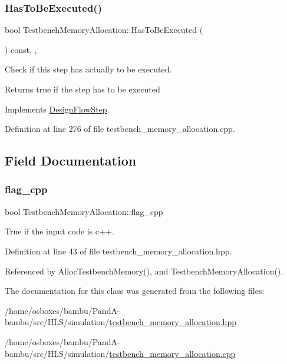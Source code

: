 \subsubsection{\texorpdfstring{Has\+To\+Be\+Executed()}{HasToBeExecuted()}}
{\footnotesize\ttfamily bool Testbench\+Memory\+Allocation\+::\+Has\+To\+Be\+Executed (\begin{DoxyParamCaption}{ }\end{DoxyParamCaption}) const\hspace{0.3cm}{\ttfamily [override]}, {\ttfamily [protected]}, {\ttfamily [virtual]}}



Check if this step has actually to be executed. 

\begin{DoxyReturn}{Returns}
true if the step has to be executed 
\end{DoxyReturn}


Implements \hyperlink{classDesignFlowStep_a1783abe0c1d162a52da1e413d5d1ef05}{Design\+Flow\+Step}.



Definition at line 276 of file testbench\+\_\+memory\+\_\+allocation.\+cpp.



\subsection{Field Documentation}
\mbox{\label{classTestbenchMemoryAllocation_a1f1b101b3a8c2ba4738a1a733b9cd0bd}} 
\subsubsection{\texorpdfstring{flag\+\_\+cpp}{flag\_cpp}}
{\footnotesize\ttfamily bool Testbench\+Memory\+Allocation\+::flag\+\_\+cpp\hspace{0.3cm}{\ttfamily [protected]}}



True if the input code is c++. 



Definition at line 43 of file testbench\+\_\+memory\+\_\+allocation.\+hpp.



Referenced by Alloc\+Testbench\+Memory(), and Testbench\+Memory\+Allocation().



The documentation for this class was generated from the following files\+:\begin{DoxyCompactItemize}
\item 
/home/osboxes/bambu/\+Pand\+A-\/bambu/src/\+H\+L\+S/simulation/\hyperlink{testbench__memory__allocation_8hpp}{testbench\+\_\+memory\+\_\+allocation.\+hpp}\item 
/home/osboxes/bambu/\+Pand\+A-\/bambu/src/\+H\+L\+S/simulation/\hyperlink{testbench__memory__allocation_8cpp}{testbench\+\_\+memory\+\_\+allocation.\+cpp}\end{DoxyCompactItemize}
